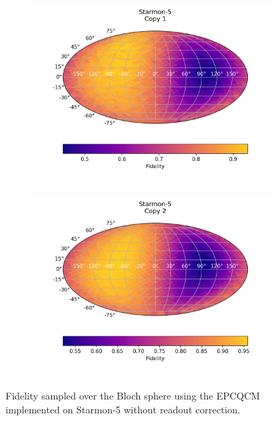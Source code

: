   \begin{figure}[H]
    \centering
    \begin{subfigure}{.5\textwidth}
      \centering
      \includegraphics[width=\textwidth]{Figures/Economical/Starmon/FullSphere/results_starmon_copy1.png}
      \label{fig:epc_uncorrected_starmon_sphere_1}
    \end{subfigure}%
    \begin{subfigure}{.5\textwidth}
      \centering
      \includegraphics[width=\textwidth]{Figures/Economical/Starmon/FullSphere/results_starmon_copy2.png}
      \label{fig:epc_uncorrected_starmon_sphere_2}
    \end{subfigure}
    \caption{Fidelity sampled over the Bloch sphere using the EPCQCM implemented on Starmon-5 without readout correction.}
    \label{fig:epc_uncorrected_starmon_sphere}
  \end{figure}
  \vspace{-0.5cm}

